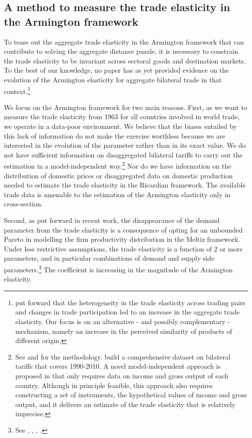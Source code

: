 \documentclass[12pt,twoside,a4paper,notitlepage]{article}
\begin{document}
\subsection{ A method to measure the trade elasticity in the Armington framework}
To tease out the aggregate trade elasticity in the Armington framework that can contribute to solving the aggregate distance puzzle, it is necessary to constrain the trade elasticity to be invariant across sectoral goods and destination markets.
To the best of our knowledge, no paper has as yet provided evidence on the evolution of the Armington elasticity for aggregate bilateral trade in that context.\footnote{\cite{Head2013} put forward that the heterogeneity in the trade elasticity across trading pairs and changes in trade participation led to an increase in the aggregate trade elasticity. Our focus is on an alternative - and possibly complementary - mechanism, namely an increase in the perceived similarity of products of different origin.} 

We focus on the Armington framework for two main reasons. 
First, as we want to measure the trade elasticity from 1963 for all countries involved in world trade, we operate in a data-poor environment. 
We believe that the biases entailed by this lack of information do not make the exercise worthless because we are interested in the evolution of the parameter rather than in its exact value.
We do not have sufficient information on disaggregated bilateral tariffs to carry out the estimation in a model-independent way.\footnote{See \cite{Head2001} and \cite{Caliendo2015} for the methodology.
\cite{Caliendo2015a} build a comprehensive dataset on bilateral tariffs that covers 1990-2010.
A novel model-independent approach is proposed in \cite{Allen2019} that only requires data on income and gross output of each country.
Although in principle feasible, this approach also requires constructing a set of instruments, the hypothetical values of income and gross output, and it delivers an estimate of the trade elasticity that is relatively imprecise.} 
Nor do we have information on the distribution of domestic prices or disaggregated data on domestic production needed to estimate the trade elasticity in the Ricardian framework.
The available trade data is amenable to the estimation of the Armington elasticity only in cross-section.
 
Second, as put forward in recent work, the disappearance of the demand parameter from the trade elasticity is a consequence of opting for an unbounded Pareto in modelling the firm productivity distribution in the Meltiz framework. Under less restrictive assumptions, the trade elasticity is a function of 2 or more parameters, and in particular combinations of demand and supply side parameters.\footnote{See \cite{Costinot2014}, \cite{Bas2017}, \cite{Feenstra2018}, \cite{Feenstra2018a}.} The coefficient is increasing in the magnitude of the Armington elasticity.
\end{document}
